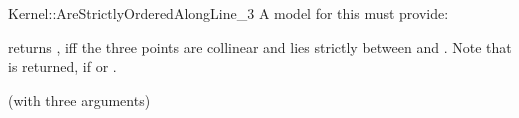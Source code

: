 \begin{ccRefFunctionObjectConcept}{Kernel::AreStrictlyOrderedAlongLine_3}
A model for this must provide:


          {returns , iff the three points are collinear and 
           lies strictly between  and .
          Note that  is returned, if  or
          .}

\ccRefines
{} (with three arguments)

\ccSeeAlso
{}  \\


\end{ccRefFunctionObjectConcept}         

